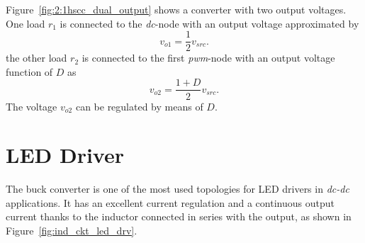 Figure~\ref{fig:2:1hscc_dual_output} shows a converter with two output voltages. One load $r_1$ is connected to the \emph{dc}-node with an output voltage approximated by
\begin{equation}
v_{o1} = \frac{1}{2} v_{src}.
\end{equation}
the other load $r_2$ is connected to the first \emph{pwm}-node with an output voltage function of $D$ as
\begin{equation}
v_{o2} = \frac{1+D}{2} v_{src}.
\end{equation}
The voltage $v_{o2}$ can be regulated by means of $D$.

%


\section{LED Driver}
The buck converter is one of the most used topologies for LED drivers in \emph{dc-dc} applications. It has an excellent current regulation and a continuous output current thanks to the inductor connected in series with the output, as shown in Figure~\ref{fig:ind_ckt_led_drv}.

